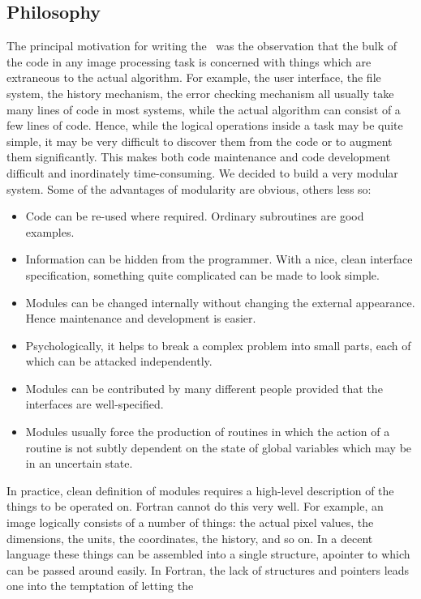 \subsection{Philosophy}

The principal motivation for writing the \sde\ was the observation that
the bulk of the code in any image processing task is concerned with
things which are extraneous to the actual algorithm. For example, the
user interface, the file system, the history mechanism, the error
checking mechanism all usually take many lines of code in most
systems, while the actual algorithm can consist of a few lines of
code. Hence, while the logical operations inside a task may be quite
simple, it may be very difficult to discover them from the code or to
augment them significantly. This makes both code maintenance and code
development difficult and inordinately time-consuming. We decided to
build a very modular system. Some of the advantages of modularity are
obvious, others less so:
\begin{itemize}
\item Code can be re-used where required. Ordinary subroutines are good
examples.
\item Information can be hidden from the programmer. With a nice, clean
interface specification, something quite complicated can be made to
look simple. 
\item Modules can be changed internally without changing the external
appearance. Hence maintenance and development is easier.
\item Psychologically, it helps to break a complex problem into small
parts, each of which can be attacked independently.
\item Modules can be contributed by many different people provided that
the interfaces are well-specified.
\item Modules usually force the production of routines in which the
action of a routine is not subtly dependent on the state of global
variables which may be in an uncertain state.
\end{itemize}
In practice, clean definition of modules requires a high-level description
of the things to be operated on. Fortran cannot do this very well. For
example, an image logically consists of a number of things: the actual
pixel values, the dimensions, the units, the coordinates, the history, and
so on. In a decent language these things can be assembled into a single
structure, apointer to which can be passed around easily. In Fortran, the 
lack of structures and pointers leads one into the temptation of letting the
